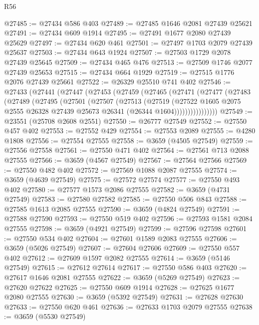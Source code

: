 \begin{lexlean}{R56}
\begin{coremodule}
@27485 := @27434 @586 @403
@27489 := @27485 @1646 @2081 @27439 @25621
@27491 := @27434 @609 @1914
@27495 := @27491 @1677 @2080 @27439 @25629
@27497 := @27434 @620 @461
@27501 := @27497 @1703 @2079 @27439 @25637
@27503 := @27434 @643 @1924
@27507 := @27503 @1729 @2078 @27439 @25645
@27509 := @27434 @465 @476
@27513 := @27509 @1746 @2077 @27439 @25653
@27515 := @27434 @664 @1929
@27519 := @27515 @1776 @2076 @27439 @25661
@27522 := @26329 @25510 @741 @402
@27546 := @27433
    (@27441
      (@27447
        (@27453
          (@27459
            (@27465
              (@27471
                (@27477
                  (@27483
                    (@27489
                      (@27495
                        (@27501
                          (@27507
                            (@27513
                              (@27519
                                (@27522
                                  @1605
                                  @2075
                                  @2555
                                  @26328
                                  @27439
                                  @25673
                                  @26341
                                  (@26344 @1604))))))))))))))))
@27549 := @23551 (@25708 @2608 @2551)
@27550 := @26777 @27549
@27552 := @27550 @457 @402
@27553 := @27552 @429
@27554 := @27553 @2089
@27555 := @4280 @1808
@27556 := @27554 @27555
@27558 := @3659 (@4505 @27549)
@27559 := @27556 @27558
@27561 := @27550 @471 @402
@27564 := @27561 @713 @2088 @27555
@27566 := @3659 (@4567 @27549)
@27567 := @27564 @27566
@27569 := @27550 @482 @402
@27572 := @27569 @1088 @2087 @27555
@27574 := @3659 (@4639 @27549)
@27575 := @27572 @27574
@27577 := @27550 @493 @402
@27580 := @27577 @1573 @2086 @27555
@27582 := @3659 (@4731 @27549)
@27583 := @27580 @27582
@27585 := @27550 @506 @843
@27588 := @27585 @1613 @2085 @27555
@27590 := @3659 (@4824 @27549)
@27591 := @27588 @27590
@27593 := @27550 @519 @402
@27596 := @27593 @1581 @2084 @27555
@27598 := @3659 (@4921 @27549)
@27599 := @27596 @27598
@27601 := @27550 @534 @402
@27604 := @27601 @1589 @2083 @27555
@27606 := @3659 (@5026 @27549)
@27607 := @27604 @27606
@27609 := @27550 @557 @402
@27612 := @27609 @1597 @2082 @27555
@27614 := @3659 (@5146 @27549)
@27615 := @27612 @27614
@27617 := @27550 @586 @403
@27620 := @27617 @1646 @2081 @27555
@27622 := @3659 (@5269 @27549)
@27623 := @27620 @27622
@27625 := @27550 @609 @1914
@27628 := @27625 @1677 @2080 @27555
@27630 := @3659 (@5392 @27549)
@27631 := @27628 @27630
@27633 := @27550 @620 @461
@27636 := @27633 @1703 @2079 @27555
@27638 := @3659 (@5530 @27549)

\end{coremodule}
\end{lexlean}
